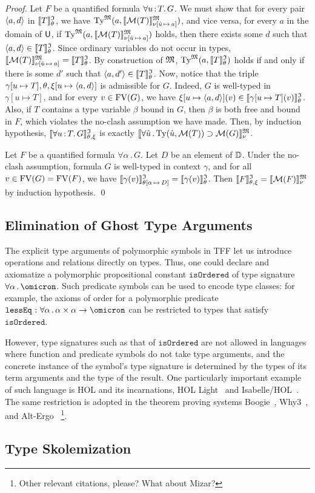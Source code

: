 \begin{proof}
Let $F$ be a quantified formula $\forall u \operatorname{:} T .\, G$.
We must show that for every pair $\langle a,d \rangle$ in $\llbracket T\rrbracket^{\mathfrak{I}}_{\theta}$, we have
$\mathrm{Ty}^{\mathfrak{M}}(a, \llbracket \mathcal{M}(T) \rrbracket^{\mathfrak{M}}_{\nu[\hat{u}\,\mapsto\,a]})$,
and vice versa, for every $a$ in the domain of $\mathsf{U}$, if
$\mathrm{Ty}^{\mathfrak{M}}(a, \llbracket \mathcal{M}(T) \rrbracket^{\mathfrak{M}}_{\nu[\hat{u}\,\mapsto\,a]})$
holds, then there exists some $d$ such that $\langle a,d \rangle \in
\llbracket T\rrbracket^{\mathfrak{I}}_{\theta}$.
%
Since ordinary variables do not occur in types,
$\llbracket \mathcal{M}(T) \rrbracket^{\mathfrak{M}}_{\nu[\hat{u}\,\mapsto\,a]} =
\llbracket T \rrbracket^{\mathfrak{I}}_\theta$.
By construction of $\mathfrak{M}$,
$\mathrm{Ty}^{\mathfrak{M}}(a, \llbracket T \rrbracket^{\mathfrak{I}}_\theta)$
holds if and only if there is some $d'$ such that
$\langle a,d' \rangle \in \llbracket T \rrbracket^{\mathfrak{I}}_\theta$.
%
Now, notice that the triple $\gamma[u \mapsto T],
\theta,\xi[u \mapsto \langle a,d \rangle]$ is admissible for $G$.
Indeed, $G$ is well-typed in $\gamma[u \mapsto T]$,
and for every $v \in \mathrm{FV}(G)$, we have
$\xi[u \mapsto \langle a,d \rangle](v) \in \llbracket\gamma[u \mapsto T](v)\rrbracket^{\mathfrak{I}}_{\theta}$.
Also, if $T$ contains a type variable $\beta$ bound in $G$,
then $\beta$ is both free and bound in $F$, which violates
the no-clash assumption we have made.
%
Then, by induction hypothesis, $\llbracket\forall u \operatorname{:} T .\, G\rrbracket^{\mathfrak{I}}_{\theta,\xi}$
is exactly $\llbracket \forall \hat{u} \,.\, \mathrm{Ty}(\hat{u},\mathcal{M}(T))
\supset \mathcal{M}(G) \rrbracket^{\mathfrak{M}}_{\nu}$.

Let $F$ be a quantified formula $\forall \alpha \,.\, G$.
Let $D$ be an element of $\mathbb{D}$. Under the no-clash assumption,
formula $G$ is well-typed in context $\gamma$, and for all
$v \in \mathrm{FV}(G) = \mathrm{FV}(F)$, we have
$\llbracket\gamma(v)\rrbracket^{\mathfrak{I}}_{\theta[\alpha\,\mapsto\,D]} = \llbracket\gamma(v)\rrbracket^{\mathfrak{I}}_{\theta}$.
Then $\llbracket F\rrbracket^{\mathfrak{I}}_{\theta,\xi} = \llbracket \mathcal{M}(F) \rrbracket^{\mathfrak{M}}_{\nu}$ by induction hypothesis.
\qed
\end{proof}

\subsection{Elimination of Ghost Type Arguments} \label{ssec:ghost}
The explicit type arguments of polymorphic symbols
in TFF let us introduce operations and relations directly on types.
Thus, one could declare and axiomatize a polymorphic propositional
constant $\mathtt{isOrdered}$ of type signature $\forall\alpha\,.\,\omicron$.
Such predicate symbols can be used to encode type classes:
for example, the axioms of order for a polymorphic predicate
$\mathtt{lessEq} \,\ty\, \forall\alpha\,.\,\alpha\times\alpha\to\omicron$
can be restricted to types that satisfy $\mathtt{isOrdered}$.

However, type signatures such as that of $\mathtt{isOrdered}$ are not
allowed in languages where function and predicate symbols do not take
type arguments, and the concrete instance of the symbol's type signature
is determined by the types of its term arguments and the type of the
result. One particularly important example of such language is HOL
and its incarnations, HOL Light~\cite{harrison09hollight} and
Isabelle/HOL~\cite{NipkowPaulsonWenzel2002Isabelle}.
The same restriction is adopted in the theorem proving systems
Boogie~\cite{leino10tacas}, Why3~\cite{boogie11why3}, and
Alt-Ergo~\cite{conchon08smt}%
\footnote{Other relevant citations, please? What about Mizar?}.


\subsection{Type Skolemization} \label{ssec:skol}



